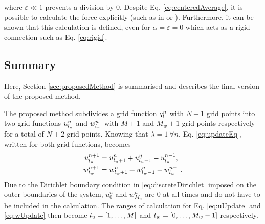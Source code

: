 where $\varepsilon \ll 1$ prevents a division by 0. Despite Eq. \eqref{eq:centeredAverage}, it is possible to calculate the force explicitly (such as in \cite{bilbao2009} or \cite{bilbao2009Dafx}). Furthermore, it can be shown that this calculation is defined, even for $\alpha  = \varepsilon = 0$ which acts as a rigid connection such as Eq. \eqref{eq:rigid}.

% 

\subsection{Summary}
Here, Section \ref{sec:proposedMethod} is summarised and describes the final version of the proposed method.

The proposed method subdivides a grid function $q_l^n$ with $ N+1$ grid points into two grid functions $u_{l_u}^n$ and $w_{l_w}^n$ with $M+1$ and $M_w+1$ grid points respectively for a total of $N+2$ grid points. Knowing that $\lambda=1\ \forall n$, Eq. \eqref{eq:updateEq}, written for both grid functions, becomes 
\begin{subequations}\label{eq:uwUpdates}
    \begin{align}
        u_{l_u}^{n+1} &= u_{{l_u}+1}^n + u_{{l_u}-1}^n - u_{l_u}^{n-1},\label{eq:uUpdate}\\
        w_{l_w}^{n+1} &= w_{{l_w}+1}^n + w_{{l_w}-1}^n - w_{l_w}^{n-1}\label{eq:wUpdate}.
    \end{align}
\end{subequations}
%
Due to the Dirichlet boundary condition in \eqref{eq:discreteDirichlet} imposed on the outer boundaries of the system, $u_0^n$ and $w_{M_w}^n$ are $0$ at all times and do not have to be included in the calculation. The ranges of calculation for Eq. \eqref{eq:uUpdate} and \eqref{eq:wUpdate} then become ${l_u} = [1, \hdots, M]$ and ${l_w} = [0, \hdots, M_w - 1]$ respectively. 

